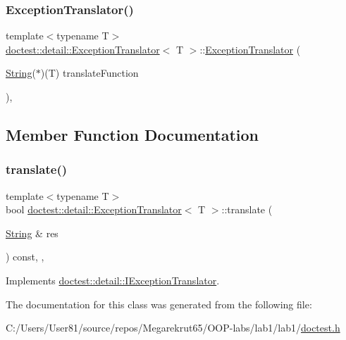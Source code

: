 \subsubsection{\texorpdfstring{Exception\+Translator()}{ExceptionTranslator()}}
{\footnotesize\ttfamily template$<$typename T$>$ \\
\mbox{\hyperlink{classdoctest_1_1detail_1_1_exception_translator}{doctest\+::detail\+::\+Exception\+Translator}}$<$ T $>$\+::\mbox{\hyperlink{classdoctest_1_1detail_1_1_exception_translator}{Exception\+Translator}} (\begin{DoxyParamCaption}\item[{\mbox{\hyperlink{classdoctest_1_1_string}{String}}($\ast$)(T)}]{translate\+Function }\end{DoxyParamCaption})\hspace{0.3cm}{\ttfamily [inline]}, {\ttfamily [explicit]}}



\subsection{Member Function Documentation}
\mbox{\label{classdoctest_1_1detail_1_1_exception_translator_a56484c4218a06bbbd1548335a8b64110}} 
\subsubsection{\texorpdfstring{translate()}{translate()}}
{\footnotesize\ttfamily template$<$typename T$>$ \\
bool \mbox{\hyperlink{classdoctest_1_1detail_1_1_exception_translator}{doctest\+::detail\+::\+Exception\+Translator}}$<$ T $>$\+::translate (\begin{DoxyParamCaption}\item[{\mbox{\hyperlink{classdoctest_1_1_string}{String}} \&}]{res }\end{DoxyParamCaption}) const\hspace{0.3cm}{\ttfamily [inline]}, {\ttfamily [override]}, {\ttfamily [virtual]}}



Implements \mbox{\hyperlink{structdoctest_1_1detail_1_1_i_exception_translator_a9c56005e4c83c13b859cc2e31102bfbc}{doctest\+::detail\+::\+I\+Exception\+Translator}}.



The documentation for this class was generated from the following file\+:\begin{DoxyCompactItemize}
\item 
C\+:/\+Users/\+User81/source/repos/\+Megarekrut65/\+O\+O\+P-\/labs/lab1/lab1/\mbox{\hyperlink{doctest_8h}{doctest.\+h}}\end{DoxyCompactItemize}
